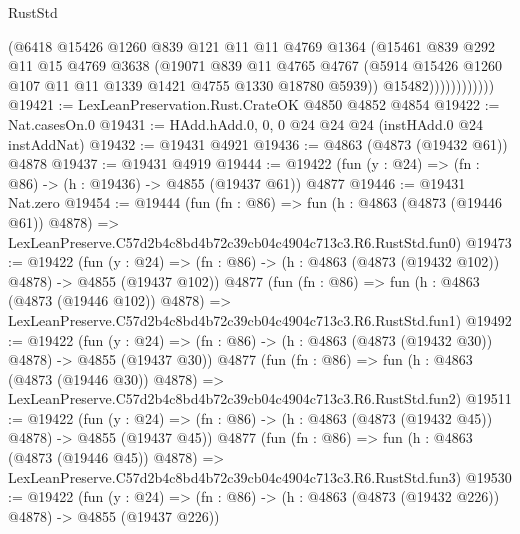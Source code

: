 \begin{lexlean}{RustStd}
\begin{coremodule}
                        (@6418
                          @15426
                          @1260
                          @839
                          @121
                          @11
                          @11
                          @4769
                          @1364
                          (@15461
                            @839
                            @292
                            @11
                            @15
                            @4769
                            @3638
                            (@19071
                              @839
                              @11
                              @4765
                              @4767
                              (@5914
                                @15426
                                @1260
                                @107
                                @11
                                @11
                                @1339
                                @1421
                                @4755
                                @1330
                                @18780
                                @5939))
                            @15482))))))))))))
@19421 := LexLeanPreservation.Rust.CrateOK @4850 @4852 @4854
@19422 := Nat.casesOn.{0}
@19431 := HAdd.hAdd.{0, 0, 0} @24 @24 @24 (instHAdd.{0} @24 instAddNat)
@19432 := @19431 @4921
@19436 := @4863 (@4873 (@19432 @61)) @4878
@19437 := @19431 @4919
@19444 := @19422 (fun (y : @24) => (fn : @86) -> (h : @19436) -> @4855 (@19437 @61)) @4877
@19446 := @19431 Nat.zero
@19454 := @19444
    (fun (fn : @86) =>
    fun (h : @4863 (@4873 (@19446 @61)) @4878) =>
    LexLeanPreserve.C57d2b4c8bd4b72c39cb04c4904c713c3.R6.RustStd.fun0)
@19473 := @19422
    (fun (y : @24) => (fn : @86) -> (h : @4863 (@4873 (@19432 @102)) @4878) -> @4855 (@19437 @102))
    @4877
    (fun (fn : @86) =>
    fun (h : @4863 (@4873 (@19446 @102)) @4878) =>
    LexLeanPreserve.C57d2b4c8bd4b72c39cb04c4904c713c3.R6.RustStd.fun1)
@19492 := @19422
    (fun (y : @24) => (fn : @86) -> (h : @4863 (@4873 (@19432 @30)) @4878) -> @4855 (@19437 @30))
    @4877
    (fun (fn : @86) =>
    fun (h : @4863 (@4873 (@19446 @30)) @4878) =>
    LexLeanPreserve.C57d2b4c8bd4b72c39cb04c4904c713c3.R6.RustStd.fun2)
@19511 := @19422
    (fun (y : @24) => (fn : @86) -> (h : @4863 (@4873 (@19432 @45)) @4878) -> @4855 (@19437 @45))
    @4877
    (fun (fn : @86) =>
    fun (h : @4863 (@4873 (@19446 @45)) @4878) =>
    LexLeanPreserve.C57d2b4c8bd4b72c39cb04c4904c713c3.R6.RustStd.fun3)
@19530 := @19422
    (fun (y : @24) => (fn : @86) -> (h : @4863 (@4873 (@19432 @226)) @4878) -> @4855 (@19437 @226))

\end{coremodule}
\end{lexlean}
